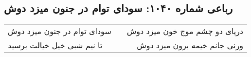 \begin{center}
\section*{رباعی شماره ۱۰۴۰: سودای توام در جنون میزد دوش}
\label{sec:1040}
\begin{longtable}{l p{0.5cm} r}
سودای توام در جنون میزد دوش
&&
دریای دو چشم موج خون میزد دوش
\\
تا نیم شبی خیل خیالت برسید
&&
ورنی جانم خیمه برون میزد دوش
\\
\end{longtable}
\end{center}
